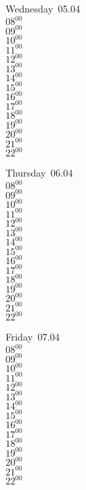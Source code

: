\documentclass[11pt,a4paper]{book}\usepackage[]{graphicx}\usepackage[]{color}
\begin{document}
\begin{weekdaybox}
  Wednesday~05.04\\
  { 
  \vfill
  $08^{00}$\\
$09^{00}$\\
$10^{00}$\\
$11^{00}$\\
$12^{00}$\\
$13^{00}$\\
$14^{00}$\\
$15^{00}$\\
$16^{00}$\\
$17^{00}$\\
$18^{00}$\\
$19^{00}$\\
$20^{00}$\\
$21^{00}$\\
$22^{00}$\\
  }
\end{weekdaybox}
\clearpage
\begin{headerbox}
\end{headerbox}
\begin{weekdaybox}
  Thursday~06.04\\
  { 
  \vfill
  $08^{00}$\\
$09^{00}$\\
$10^{00}$\\
$11^{00}$\\
$12^{00}$\\
$13^{00}$\\
$14^{00}$\\
$15^{00}$\\
$16^{00}$\\
$17^{00}$\\
$18^{00}$\\
$19^{00}$\\
$20^{00}$\\
$21^{00}$\\
$22^{00}$\\
  }
\end{weekdaybox} 
\begin{weekdaybox}
  Friday~07.04\\
  { 
  \vfill
  $08^{00}$\\
$09^{00}$\\
$10^{00}$\\
$11^{00}$\\
$12^{00}$\\
$13^{00}$\\
$14^{00}$\\
$15^{00}$\\
$16^{00}$\\
$17^{00}$\\
$18^{00}$\\
$19^{00}$\\
$20^{00}$\\
$21^{00}$\\
$22^{00}$\\
  }
\end{weekdaybox}
\end{document}
